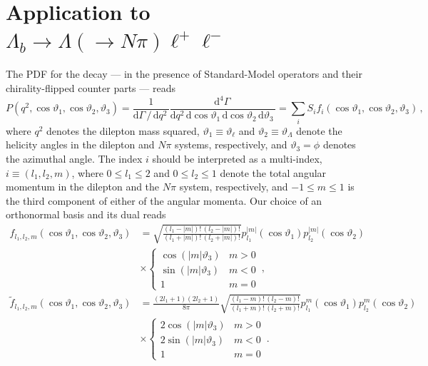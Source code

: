 \documentclass[aps,prd,reprint,nofootinbib,preprintnumbers]{revtex4}
\newcommand{\rmdx}[1]{\mbox{d} #1 \,} %
\renewcommand{\theta}{\vartheta}
\begin{document}
\section{Application to $\Lambda_b\to \Lambda(\to N \pi)\ell^+\ell^-$}
\label{app:lambdabtolambdall}

The PDF for the decay --- in the presence of Standard-Model operators and their chirality-flipped counter parts --- reads \cite{Boeer:2014xx}
\begin{equation}
    P(q^2, \cos\theta_1, \cos\theta_2, \theta_3) = \frac{1}{\rmdx{\Gamma} /\, \rmdx{q^2}} \frac{\rmdx{^4\Gamma}}{\rmdx{q^2} \rmdx{\cos\theta_1} \rmdx{\cos\theta_2} \rmdx{\theta_3}} = \sum_i S_i f_i(\cos\theta_1, \cos\theta_2, \theta_3)\,,
\end{equation}
where $q^2$ denotes the dilepton mass squared, $\theta_1 \equiv \theta_\ell$ and $\theta_2 \equiv \theta_\Lambda$ denote the
helicity angles in the dilepton and
$N\pi$ systems, respectively, and $\theta_3 = \phi$ denotes the azimuthal angle.
The index $i$ should be interpreted as a multi-index, $i \equiv (l_1, l_2, m)$,
where $0 \leq l_1 \leq 2$ and $0 \leq l_2 \leq 1$ denote the total angular momentum in the
dilepton and the $N\pi$ system, respectively, and $-1 \leq m \leq 1$
is the third component of either of the angular momenta.
Our choice of an orthonormal basis and its dual reads
\begin{equation}
\label{eq:lambdab:bases}
\begin{aligned}
    f_{l_1, l_2, m}(\cos\theta_1, \cos\theta_2, \theta_3)
    & = \sqrt{\frac{(l_1 - |m|)!\,(l_2 - |m|)!}{(l_1 + |m|)!\,(l_2 + |m|)!}} p_{l_1}^{|m|}(\cos\theta_1) p_{l_2}^{|m|}(\cos\theta_2)\\
    & \times \begin{cases}
            \cos(|m|\theta_3) & m > 0\\
            \sin(|m|\theta_3) & m < 0\\
            1                 & m = 0
        \end{cases}\,,\\
    \tilde{f}_{l_1, l_2, m}(\cos\theta_1, \cos\theta_2, \theta_3)
    & = \frac{(2l_1 + 1)(2l_2 + 1)}{8\pi}\sqrt{\frac{(l_1 - m)!\,(l_2 - m)!}{(l_1 + m)!\,(l_2 + m)!}} p_{l_1}^m(\cos\theta_1) p_{l_2}^m(\cos\theta_2)\\
    & \times \begin{cases}
            2 \cos(|m|\theta_3) & m > 0\\
            2 \sin(|m|\theta_3) & m < 0\\
            1                   & m = 0
        \end{cases}\,.\\
\end{aligned}
\end{equation}
\end{document}
